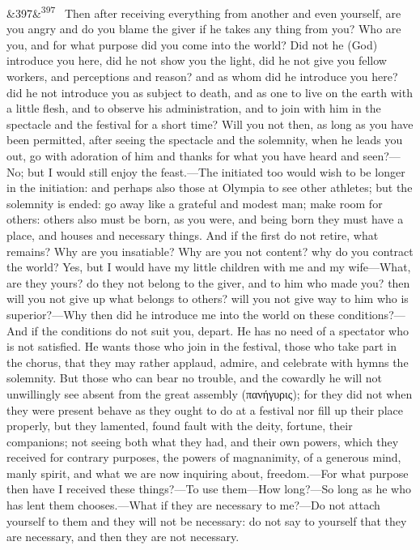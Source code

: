 \documentclass[12pt]{article}
\newcommand{\para}[1][]{\par\noindent\ifx&#1&\else\textsuperscript{\footnotesize #1}~\fi}
\begin{document}
\para[397] Then after receiving everything from another and even yourself, are you angry and do you blame the giver if he takes any thing from you? Who are you, and for what purpose did you come into the world? Did not he (God) introduce you here, did he not show you the light, did he not give you fellow workers, and perceptions and reason? and as whom did he introduce you here? did he not introduce you as subject to death, and as one to live on the earth with a little flesh, and to observe his administration, and to join with him in the spectacle and the festival for a short time? Will you not then, as long as you have been permitted, after seeing the spectacle and the solemnity, when he leads you out, go with adoration of him and thanks for what you have heard and seen?—No; but I would still enjoy the feast.—The initiated too would wish to be longer in the initiation: and perhaps also those at Olympia to see other athletes; but the solemnity is ended: go away like a grateful and modest man; make room for others: others also must be born, as you were, and being born they must have a place, and houses and necessary things. And if the first do not retire, what remains? Why are you insatiable? Why are you not content? why do you contract the world? Yes, but I would have my little children with me and my wife—What, are they yours? do they not belong to the giver, and to him who made you? then will you not give up what belongs to others? will you not give way to him who is superior?—Why then did he introduce me into the world on these conditions?—And if the conditions do not suit you, depart. He has no need of a spectator who is not satisfied. He wants those who join in the festival, those who take part in the chorus, that they may rather applaud, admire, and celebrate with hymns the solemnity. But those who can bear no trouble, and the cowardly he will not unwillingly see absent from the great assembly (πανήγυρις); for they did not when they were present behave as they ought to do at a festival nor fill up their place properly, but they lamented, found fault with the deity, fortune, their companions; not seeing both what they had, and their own powers, which they received for contrary purposes, the powers of magnanimity, of a generous mind, manly spirit, and what we are now inquiring about, freedom.—For what purpose then have I received these things?—To use them—How long?—So long as he who has lent them chooses.—What if they are necessary to me?—Do not attach yourself to them and they will not be necessary: do not say to yourself that they are necessary, and then they are not necessary.
\end{document}
